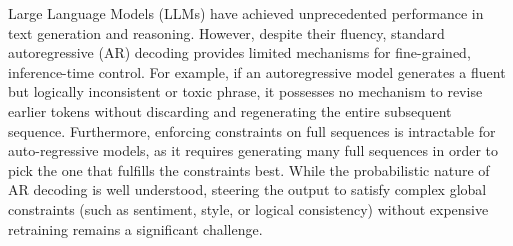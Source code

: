 \documentclass[11pt]{article}
\begin{document}


Large Language Models (LLMs) have achieved unprecedented performance in text generation and reasoning. However, despite their fluency, standard autoregressive (AR) decoding provides limited mechanisms for fine-grained, inference-time control. For example, if an autoregressive model generates a fluent but logically inconsistent or toxic phrase, it possesses no mechanism to revise earlier tokens without discarding and regenerating the entire subsequent sequence. Furthermore, enforcing constraints on full sequences is intractable for auto-regressive models, as it requires generating many full sequences in order to pick the one that fulfills the constraints best. While the probabilistic nature of AR decoding is well understood, steering the output to satisfy complex global constraints (such as sentiment, style, or logical consistency) without expensive retraining remains a significant challenge.
\end{document}
